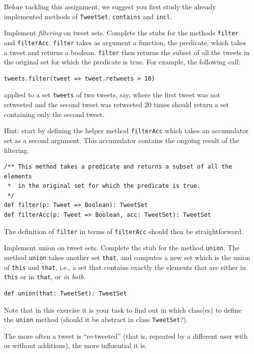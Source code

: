 \documentclass[a4paper,12pt]{exam}
\begin{document}
Before tackling this assignment, we suggest you first study the already implemented 
methods of \verb!TweetSet!, \verb!contains! and \verb!incl!.
\begin{questions}
\question
Implement \emph{filtering} on tweet sets. Complete the stubs for the methods 
\verb!filter! and \verb!filterAcc!. \verb!filter! takes as argument a function, 
the predicate, which takes a tweet and returns a boolean. \verb!filter! 
then returns the subset of all the tweets in the original set for which the predicate is true. 
For example, the following call:
\begin{Verbatim}
tweets.filter(tweet => tweet.retweets > 10)	
\end{Verbatim}
applied to a set \verb!tweets! of two tweets, say, where the first tweet was not retweeted and 
the second tweet was retweeted 20 times should return a set containing only the second tweet.

Hint: start by defining the helper method \verb!filterAcc! 
which takes an accumulator set as a second argument. 
This accumulator contains the ongoing result of the filtering.
\begin{Verbatim}
/** This method takes a predicate and returns a subset of all the elements
 *  in the original set for which the predicate is true.
 */
def filter(p: Tweet => Boolean): TweetSet
def filterAcc(p: Tweet => Boolean, acc: TweetSet): TweetSet	
\end{Verbatim}
The definition of \verb!filter! in terms of \verb!filterAcc! should then be straightforward.

\question
Implement union on tweet sets. Complete the stub for the method \verb!union!. 
The method \verb!union! takes another set \verb!that!, and computes a new set which is 
the union of \verb!this! and \verb!that!, i.e., a set that contains exactly the elements 
that are either in \verb!this! or in \verb!that!, or \emph{in both}.
\begin{Verbatim}
def union(that: TweetSet): TweetSet	
\end{Verbatim}
Note that in this exercise it is your task to find out in which class(es) to define the 
\verb!union! method (should it be abstract in class \verb!TweetSet!?).

\question
The more often a tweet is ``re-tweeted'' 
(that is, repeated by a different user with or without additions), the more influential it is.


\end{questions}
\end{document}
